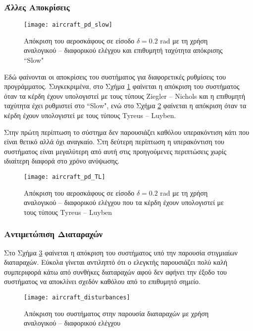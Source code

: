 \subsubsection{Άλλες Αποκρίσεις}

\begin{figure}[h]
  \centering
  \texttt{[image: aircraft\_pd\_slow]}
  \caption{Απόκριση του αεροσκάφους σε είσοδο $\delta = 0.2$ rad με τη χρήση αναλογικού -- διαφορικού ελέγχου και επιθυμητή ταχύτητα απόκρισης ``Slow"}
  \label{fig:aircraft_pd_slow}
\end{figure}

Εδώ φαίνονται οι αποκρίσεις του συστήματος για διαφορετικές ρυθμίσεις του προγράμματος. Συγκεκριμένα, στο Σχήμα \ref{fig:aircraft_pd_slow} φαίνεται η απόκριση του συστήματος όταν τα κέρδη έχουν υπολογιστεί με τους τύπους Ziegler -- Nichols και η επιθυμητή ταχύτητα έχει ρυθμιστεί στο ``Slow", ενώ στο Σχήμα \ref{fig:aircraft_pd_TL} φαίνεται η απόκριση όταν τα κέρδη έχουν υπολογιστεί με τους τύπους Tyreus -- Luyben.

Στην πρώτη περίπτωση το σύστημα δεν παρουσιάζει καθόλου υπερακόντιση κάτι που είναι θετικό αλλά όχι αναγκαίο. Στη δεύτερη περίπτωση η υπερακόντιση του συστήματος είναι μεγαλύτερη από αυτή στις προηγούμενες περιπτώσεις χωρίς ιδιαίτερη διαφορά στο χρόνο ανύψωσης.



\begin{figure}[h]
  \centering
  \texttt{[image: aircraft\_pd\_TL]}
  \caption{Απόκριση του αεροσκάφους σε είσοδο $\delta = 0.2$ rad με τη χρήση αναλογικού -- διαφορικού ελέγχου που τα κέρδη έχουν υπολογιστεί με τους τύπους Tyreus -- Luyben}
  \label{fig:aircraft_pd_TL}
\end{figure}

\subsubsection{Αντιμετώπιση Διαταραχών}

Στο Σχήμα \ref{fig:aircraft_disturbances} φαίνεται η απόκριση του συστήματος υπό την παρουσία στιγμιαίων διαταραχών. Εύκολα γίνεται αντιληπτό ότι ο ελεγκτής παρουσιάζει πολύ καλή συμπεριφορά κάτω από συνθήκες διαταραχών αφού δεν αφήνει την έξοδο του συστήματος να αποκλίνει σχεδόν καθόλου από το επιθυμητό σημείο.

\begin{figure}[h]
  \centering
  \texttt{[image: aircraft\_disturbances]}
  \caption{Απόκριση του συστήματος στην παρουσία διαταραχών με χρήση αναλογικού -- διαφορικού ελέγχου}
  \label{fig:aircraft_disturbances}
\end{figure}

